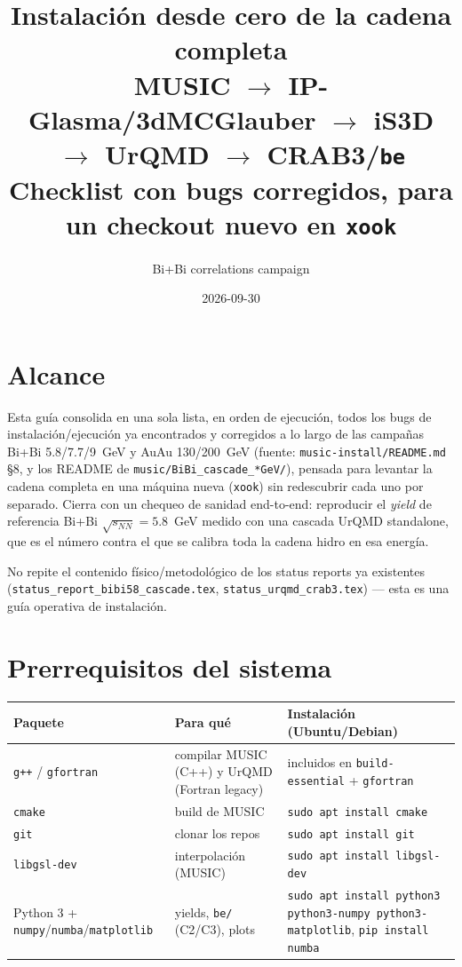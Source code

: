 \documentclass[11pt]{article}
\title{Instalación desde cero de la cadena completa\\
MUSIC $\to$ IP-Glasma/3dMCGlauber $\to$ iS3D $\to$ UrQMD $\to$ CRAB3/\texttt{be}\\
\large Checklist con bugs corregidos, para un checkout nuevo en \texttt{xook}}
\author{Bi+Bi correlations campaign}
\date{2026-09-30}
\begin{document}
\maketitle

\section{Alcance}

Esta guía consolida en una sola lista, en orden de ejecución, todos los
bugs de instalación/ejecución ya encontrados y corregidos a lo largo de las
campañas Bi+Bi 5.8/7.7/9~GeV y AuAu 130/200~GeV (fuente:
\texttt{music-install/README.md} \S8, y los README de
\texttt{music/BiBi\_cascade\_*GeV/}), pensada para levantar la cadena
completa en una máquina nueva (\texttt{xook}) sin redescubrir cada uno por
separado. Cierra con un chequeo de sanidad end-to-end: reproducir el
\emph{yield} de referencia Bi+Bi $\sqrt{s_{NN}}=5.8$~GeV medido con una
cascada UrQMD standalone, que es el número contra el que se calibra toda la
cadena hidro en esa energía.

No repite el contenido físico/metodológico de los status reports ya
existentes (\texttt{status\_report\_bibi58\_cascade.tex},
\texttt{status\_urqmd\_crab3.tex}) — esta es una guía operativa de
instalación.

\section{Prerrequisitos del sistema}

\begin{longtable}{L{4cm}L{5cm}L{6cm}}
\toprule
Paquete & Para qué & Instalación (Ubuntu/Debian) \\
\midrule
\endhead
\texttt{g++} / \texttt{gfortran} & compilar MUSIC (C++) y UrQMD (Fortran legacy) & incluidos en \texttt{build-essential} + \texttt{gfortran} \\
\texttt{cmake} & build de MUSIC & \texttt{sudo apt install cmake} \\
\texttt{git} & clonar los repos & \texttt{sudo apt install git} \\
\texttt{libgsl-dev} & interpolación (MUSIC) & \texttt{sudo apt install libgsl-dev} \\
Python 3 + \texttt{numpy}/\texttt{numba}/\texttt{matplotlib} & yields, \texttt{be/} (C2/C3), plots & \texttt{sudo apt install python3 python3-numpy python3-matplotlib}, \texttt{pip install numba} \\
\bottomrule
\end{longtable}
\end{document}
